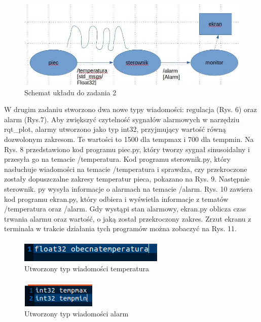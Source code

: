 \documentclass[10pt,a4paper,twoside,twocolumn]{article}%
\begin{document}
\begin{figure}[H]
    \centering
    \includegraphics[width=\linewidth]{1.png}
    \caption{Schemat układu do zadania 2}
\end{figure}

W drugim zadaniu stworzono dwa nowe typy wiadomości: regulacja (Rys\@. 6) oraz
alarm (Rys\@.7). Aby zwiększyć czytelność sygnałów alarmowych w narzędziu
rqt\_plot, alarmy utworzono jako typ int32, przyjmujący wartość równą dozwolonym
zakresom. Te wartości to 1500 dla tempmax i 700 dla tempmin. Na Rys\@. 8
przedstawiono kod programu piec.py, który tworzy sygnał sinusoidalny i przesyła
go na temacie /temperatura. Kod programu sterownik.py, który nasłuchuje
wiadomości na temacie /temperatura i sprawdza, czy przekroczone zostały
dopuszczalne zakresy temperatur pieca, pokazano na Rys\@. 9. Następnie sterownik.
py wysyła informacje o alarmach na temacie /alarm. Rys\@. 10 zawiera kod programu
ekran.py, który odbiera i wyświetla informacje z tematów /temperatura oraz
/alarm. Gdy wystąpi stan alarmowy, ekran.py oblicza czas trwania alarmu oraz
wartość, o jaką został przekroczony zakres. Zrzut ekranu z terminala w trakcie
działania tych programów można zobaczyć na Rys\@. 11.

\begin{figure}[H]
    \centering
    \includegraphics[width=0.6\linewidth]{2.png}
    \caption{Utworzony typ wiadomości temperatura}
\end{figure}

\begin{figure}[H]
    \centering
    \includegraphics[width=0.4\linewidth]{3.png}
    \caption{Utworzony typ wiadomości alarm}
\end{figure}
\end{document}
